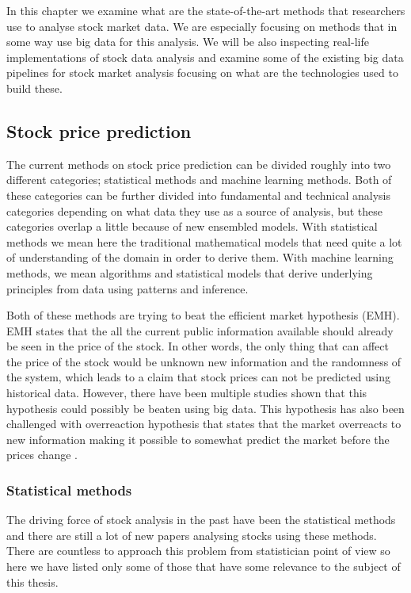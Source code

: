 In this chapter we examine what are the state-of-the-art methods that researchers use to analyse stock market data.
We are especially focusing on methods that in some way use big data for this analysis.
We will be also inspecting real-life implementations of stock data analysis and examine some of the existing big data pipelines for stock market analysis focusing on what are the technologies used to build these.

\subsection{Stock price prediction}

The current methods on stock price prediction can be divided roughly into two different categories; statistical methods and machine learning methods.
Both of these categories can be further divided into fundamental and technical analysis categories depending on what data they use as a source of analysis, but these categories overlap a little because of new ensembled models.
With statistical methods we mean here the traditional mathematical models that need quite a lot of understanding of the domain in order to derive them.
With machine learning methods, we mean algorithms and statistical models that derive underlying principles from data using patterns and inference.

Both of these methods are trying to beat the efficient market hypothesis (EMH).
EMH states that the all the current public information available should already be seen in the price of the stock.
In other words, the only thing that can affect the price of the stock would be unknown new information and the randomness of the system, which leads to a claim that stock prices can not be predicted using historical data.
However, there have been multiple studies shown that this hypothesis could possibly be beaten using big data. \cite{nam}
This hypothesis has also been challenged with overreaction hypothesis that states that the market overreacts to new information making it possible to somewhat predict the market before the prices change \cite{day}.

\subsubsection{Statistical methods}

The driving force of stock analysis in the past have been the statistical methods and there are still a lot of new papers analysing stocks using these methods.
There are countless to approach this problem from statistician point of view so here we have listed only some of those that have some relevance to the subject of this thesis.

